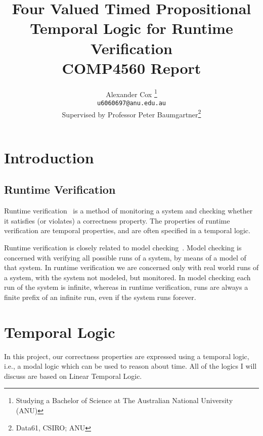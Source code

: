 \documentclass[a4paper]{article}
\title{
  Four Valued Timed Propositional Temporal Logic for Runtime Verification\\
  \normalsize{} COMP4560 Report
}
\author{
  Alexander Cox
  \thanks{Studying a Bachelor of Science at The Australian National University (ANU)}\\
  \small\texttt{u6060697@anu.edu.au}\\
  \normalsize{}Supervised by Professor Peter Baumgartner\thanks{Data61, CSIRO\@; ANU}
}
\begin{document}
\maketitle

\begin{abstract}
\end{abstract}
\newpage
\tableofcontents

\section{Introduction}
\subsection{Runtime Verification}
Runtime verification~\autocite{colin2005rv} is a method of monitoring a system and checking whether it satisfies (or violates) a correctness property.
The properties of runtime verification are temporal properties, and are often specified in a temporal logic. %

Runtime verification is closely related to model checking~\autocite{baier2008principles}. Model checking is concerned with verifying all possible runs of a system, by means of a model of that system. In runtime verification we are concerned only with real world runs of a system, with the system not modeled, but monitored. In model checking each run of the system is infinite, whereas in runtime verification, runs are always a finite prefix of an infinite run, even if the system runs forever.


\section{Temporal Logic}
In this project, our correctness properties are expressed using a temporal logic, i.e., a modal logic which can be used to reason about time. All of the logics I will discuss are based on Linear Temporal Logic.

\end{document}
